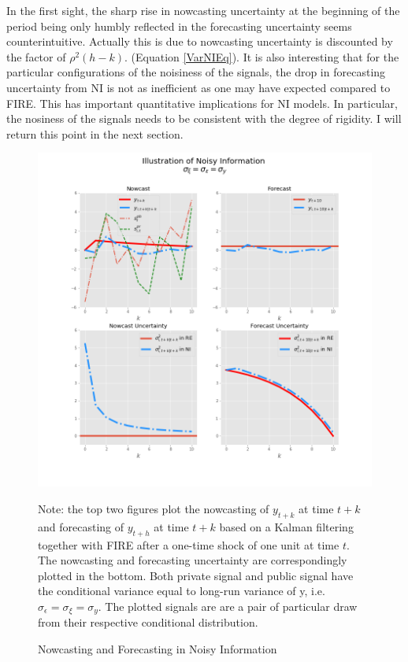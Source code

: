 \documentclass[12pt]{article}
\begin{document}
	In the first sight, the sharp rise in nowcasting uncertainty at the beginning of the period being only humbly reflected in the forecasting uncertainty seems counterintuitive. Actually this is due to nowcasting uncertainty is discounted by the factor of $\rho^2(h-k)$.  (Equation \ref{VarNIEq}). It is also interesting that for the particular configurations of the noisiness of the signals, the drop in forecasting uncertainty from NI is not as inefficient as one may have expected compared to FIRE.  This has important quantitative implications for NI models. In particular, the nosiness of the signals needs to be consistent with the degree of rigidity. I will return this point in the next section.  
	
	\begin{figure}[ht]
		\centering
		\includegraphics[width=13cm]{figures/ni_illustration.png}  \\
		\begin{flushleft}
		{\footnotesize Note: the top two figures plot the nowcasting of $y_{t+k}$  at time $t+k$ and forecasting of $y_{t+h}$ at time $t+k$  based on a Kalman filtering together with FIRE after a one-time shock of one unit at time $t$. The nowcasting and forecasting uncertainty are correspondingly plotted in the bottom. Both private signal and public signal have the conditional variance equal to long-run variance of y, i.e.  $\sigma_\epsilon = \sigma_\xi = \sigma_y$. The plotted signals are are a pair of particular draw from their respective conditional distribution. }
		\end{flushleft}
		\caption{Nowcasting and Forecasting in Noisy Information}
		\label{IllustrateNI}
	\end{figure}
	
\end{document}

